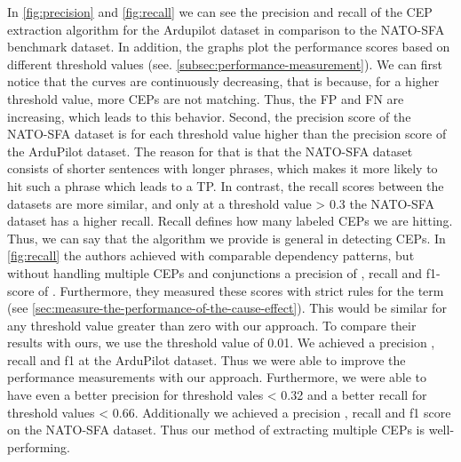In \autoref{fig:precision} and \autoref{fig:recall} we can see the precision and recall of the \ac{CEP} extraction algorithm for the Ardupilot dataset in comparison to the NATO-SFA benchmark dataset.
In addition, the graphs plot the performance scores based on different threshold values (see. \autoref{subsec:performance-measurement}).
We can first notice that the curves are continuously decreasing, that is because, for a higher threshold value, more \ac{CEP}s are not matching.
Thus, the \ac{FP} and \ac{FN} are increasing, which leads to this behavior.
Second, the precision score of the \ac{NATO-SFA} dataset is for each threshold value higher than the precision score of the ArduPilot dataset.
The reason for that is that the \ac{NATO-SFA} dataset consists of shorter sentences with longer phrases, which makes it more likely to hit such a phrase which leads to a \ac{TP}.
In contrast, the recall scores between the datasets are more similar, and only at a threshold value > 0.3 the \ac{NATO-SFA} dataset has a higher recall.
Recall defines how many labeled \ac{CEP}s we are hitting.
Thus, we can say that the algorithm we provide is general in detecting \ac{CEP}s.
In \autoref{fig:recall} the authors achieved with comparable dependency patterns, but without handling multiple \ac{CEP}s and conjunctions a precision of ,  recall  and f1-score of .
Furthermore, they measured these scores with strict rules for the  term (see \autoref{sec:measure-the-performance-of-the-cause-effect}).
This would be similar for any threshold value greater than zero with our approach.
To compare their results with ours, we use the threshold value of 0.01.
We achieved a precision , recall  and f1  at the ArduPilot dataset.
Thus we were able to improve the performance measurements with our approach.
Furthermore, we were able to have even a better precision for threshold vales < 0.32 and a better recall for threshold values < 0.66.
Additionally we achieved a precision , recall  and f1  score on the \ac{NATO-SFA} dataset.
Thus our method of extracting multiple \ac{CEP}s is well-performing.


